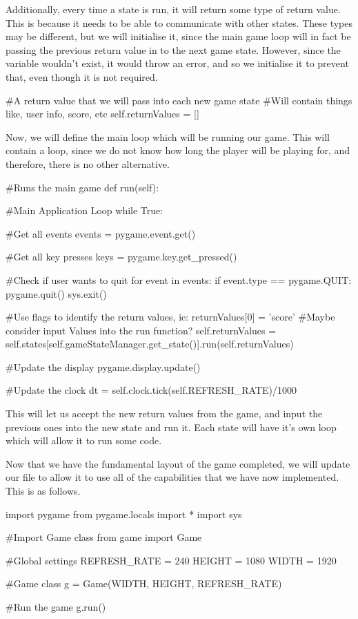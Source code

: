 \vs
Additionally, every time a state is run, it will return some type of return value. This is because it needs to be able to communicate with other states. These types may be different, but we will initialise it, since the main game loop will in fact be passing the previous return value in to the next game state. However, since the variable wouldn't exist, it would throw an error, and so we initialise it to prevent that, even though it is not required.
\vs
\begin{mpy}
        #A return value that we will pass into each new game state
        #Will contain things like, user info, score, etc
        self.returnValues = []
\end{mpy}


Now, we will define the main loop which will be running our game. This will contain a  loop, since we do not know how long the player will be playing for, and therefore, there is no other alternative. 


\begin{mpy}
    #Runs the main game
    def run(self):

        #Main Application Loop
        while True:

            #Get all events
            events = pygame.event.get()

            #Get all key presses
            keys = pygame.key.get_pressed()

            #Check if user wants to quit
            for event in events:
                if event.type == pygame.QUIT:
                    pygame.quit()
                    sys.exit()

            #Use flags to identify the return values, ie: returnValues[0] = 'score'
            #Maybe consider input Values into the run function?
            self.returnValues = self.states[self.gameStateManager.get_state()].run(self.returnValues)

            #Update the display
            pygame.display.update()

            #Update the clock
            dt = self.clock.tick(self.REFRESH_RATE)/1000
\end{mpy}
\vs
This will let us accept the new return values from the game, and input the previous ones into the new state and run it. Each state will have it's own  loop which will allow it to run some code. 

\vs
Now that we have the fundamental layout of the game completed, we will update our  file to allow it to use all of the capabilities that we have now implemented. This is as follows.
\vs
\begin{mpy}
import pygame
from pygame.locals import *
import sys

#Import Game class
from game import Game

#Global settings
REFRESH_RATE = 240
HEIGHT = 1080
WIDTH = 1920

#Game class
g = Game(WIDTH, HEIGHT, REFRESH_RATE)

#Run the game
g.run()
\end{mpy}

